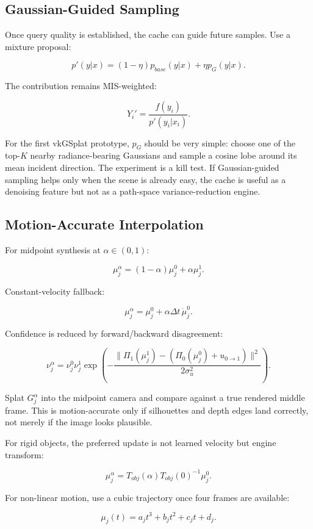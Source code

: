 \documentclass[11pt]{article}
\begin{document}
\subsection{Gaussian-Guided Sampling}

Once query quality is established, the cache can guide future samples. Use a
mixture proposal:

\[
  p'(y|x) =
  (1-\eta)p_{base}(y|x) + \eta p_G(y|x).
\]

The contribution remains MIS-weighted:

\[
  Y_i' =
  \frac{f(y_i)}{p'(y_i|x_i)}.
\]

For the first vkGSplat prototype, $p_G$ should be very simple: choose one of the
top-$K$ nearby radiance-bearing Gaussians and sample a cosine lobe around its
mean incident direction. The experiment is a kill test. If Gaussian-guided
sampling helps only when the scene is already easy, the cache is useful as a
denoising feature but not as a path-space variance-reduction engine.

\subsection{Motion-Accurate Interpolation}

For midpoint synthesis at $\alpha\in(0,1)$:

\[
  \mu_j^\alpha =
  (1-\alpha)\mu_j^0 + \alpha\mu_j^1.
\]

Constant-velocity fallback:

\[
  \mu_j^\alpha = \mu_j^0 + \alpha\Delta t\,\dot{\mu}_j^0.
\]

Confidence is reduced by forward/backward disagreement:

\[
  \nu_j^\alpha =
  \nu_j^0\nu_j^1
  \exp\left(-\frac{\| \Pi_1(\mu_j^1) -
  (\Pi_0(\mu_j^0)+u_{0\rightarrow1})\|^2}{2\sigma_u^2}\right).
\]

Splat $G_j^\alpha$ into the midpoint camera and compare against a true rendered
middle frame. This is motion-accurate only if silhouettes and depth edges land
correctly, not merely if the image looks plausible.

For rigid objects, the preferred update is not learned velocity but engine
transform:

\[
  \mu_j^\alpha =
  T_{obj}(\alpha)T_{obj}(0)^{-1}\mu_j^0.
\]

For non-linear motion, use a cubic trajectory once four frames are available:

\[
  \mu_j(t) = a_jt^3 + b_jt^2 + c_jt + d_j.
\]
\end{document}
